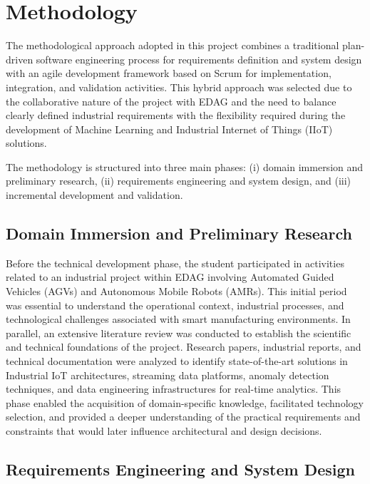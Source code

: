 \section{Methodology}

The methodological approach adopted in this project combines a traditional plan-driven software engineering process for requirements definition and system design with an agile development framework based on Scrum\cite{schwaber2020scrum} for implementation, integration, and validation activities. This hybrid approach was selected due to the collaborative nature of the project with EDAG and the need to balance clearly defined industrial requirements with the flexibility required during the development of Machine Learning and Industrial Internet of Things (IIoT) solutions.

The methodology is structured into three main phases: (i) domain immersion and preliminary research, (ii) requirements engineering and system design, and (iii) incremental development and validation.

\subsection{Domain Immersion and Preliminary Research}

Before the technical development phase, the student participated in activities related to an industrial project within EDAG involving Automated Guided Vehicles (AGVs) and Autonomous Mobile Robots (AMRs). This initial period was essential to understand the operational context, industrial processes, and technological challenges associated with smart manufacturing environments.
In parallel, an extensive literature review was conducted to establish the scientific and technical foundations of the project. Research papers, industrial reports, and technical documentation were analyzed to identify state-of-the-art solutions in Industrial IoT architectures, streaming data platforms, anomaly detection techniques, and data engineering infrastructures for real-time analytics.
This phase enabled the acquisition of domain-specific knowledge, facilitated technology selection, and provided a deeper understanding of the practical requirements and constraints that would later influence architectural and design decisions.

\subsection{Requirements Engineering and System Design}

